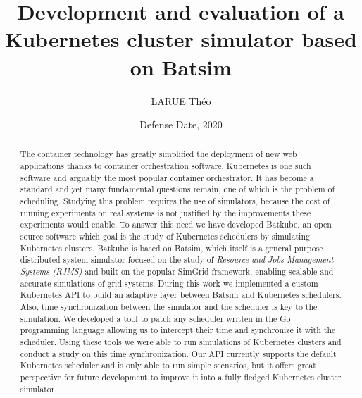 \documentclass[12pt, a4paper]{memoir}
\title{Development and evaluation of a Kubernetes cluster simulator based on
Batsim}
\author{LARUE Théo}
\date{Defense Date, 2020} %
\begin{document}
\frontmatter
\begin{titlingpage}
\maketitle
\end{titlingpage}

\setlength{\parskip}{-1pt plus 1pt}

\renewcommand{\abstracttextfont}{\normalfont}
\abstractintoc
\begin{abstract} 
	The container technology has greatly simplified the deployment of new
	web applications thanks to container orchestration software. Kubernetes
	is one such software and arguably the most popular container
	orchestrator. It has become a standard and yet many fundamental
	questions remain, one of which is the problem of scheduling. Studying
	this problem requires the use of simulators, because the cost of
	running experiments on real systems is not justified by the
	improvements these experiments would enable. To answer this need we
	have developed Batkube, an open source software which goal is the study
	of Kubernetes schedulers by simulating Kubernetes clusters.  Batkube is
	based on Batsim, which itself is a general purpose distributed system
	simulator focused on the study of \textit{Resource and Jobs Management
	Systems (RJMS)} and built on the popular SimGrid framework, enabling
	scalable and accurate simulations of grid systems.  During this work we
	implemented a custom Kubernetes API to build an adaptive layer between
	Batsim and Kubernetes schedulers. Also, time synchronization between
	the simulator and the scheduler is key to the simulation. We developed
	a tool to patch any scheduler written in the Go programming language
	allowing us to intercept their time and synchronize it with the
	scheduler. Using these tools we were able to run simulations of
	Kubernetes clusters and conduct a study on this time synchronization.
	Our API currently supports the default Kubernetes scheduler and is only
	able to run simple scenarios, but it offers great perspective for
	future development to improve it into a fully fledged Kubernetes
cluster simulator.  \end{abstract} \abstractintoc
\end{document}
